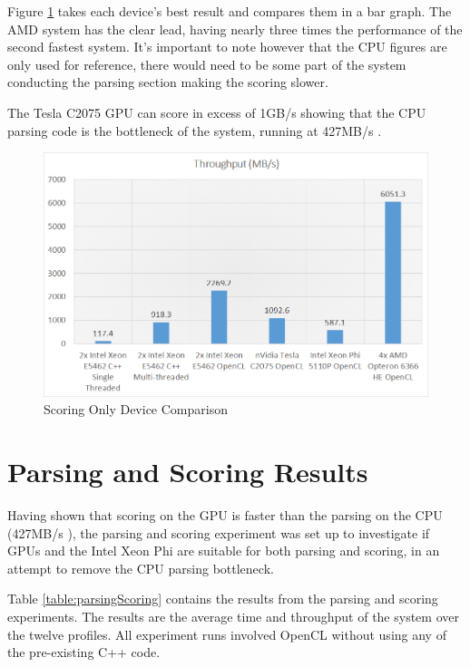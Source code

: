 Figure \ref{fig:scoringOnlyBest} takes each device's best result and compares
them in a bar graph. The AMD system has the clear lead, having nearly three
times the performance of the second fastest system. It's important to note
however that the CPU figures are only used for reference, there would need to be
some part of the system conducting the parsing section making the scoring
slower.

The Tesla C2075 GPU can score in excess of 1GB/s showing that the CPU parsing
code is the bottleneck of the system, running at 427MB/s \cite{HybridCPUFPGA}.

\begin{figure}[H]
\centering
\includegraphics[width=\linewidth]{images/scoringOnlyBest.png}
\caption{Scoring Only Device Comparison}
\label{fig:scoringOnlyBest}
\end{figure}

\section{Parsing and Scoring Results}

Having shown that scoring on the GPU is faster than the parsing on the CPU
(427MB/s \cite{HybridCPUFPGA}), the parsing and scoring experiment was set up
to investigate if GPUs and the Intel Xeon Phi are suitable for both parsing
and scoring, in an attempt to remove the CPU parsing bottleneck.

Table \ref{table:parsingScoring} contains the results from the parsing and
scoring experiments. The results are the average time and throughput of the
system over the twelve profiles. All experiment runs involved OpenCL without
using any of the pre-existing C++ code.

